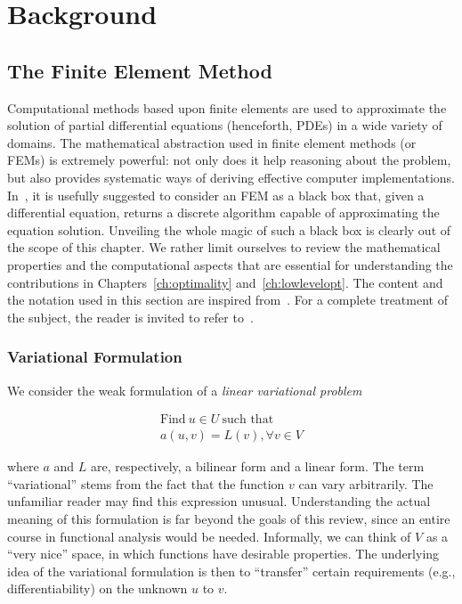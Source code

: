 \chapter{Background}

\section{The Finite Element Method}
\label{sec:bkg:fem}
Computational methods based upon finite elements are used to approximate the solution of partial differential equations (henceforth, PDEs) in a wide variety of domains. The mathematical abstraction used in finite element methods (or FEMs) is extremely powerful: not only does it help reasoning about the problem, but also provides systematic ways of deriving effective computer implementations. In~\cite{brenner-and-scott}, it is usefully suggested to consider an FEM as a black box that, given a differential equation, returns a discrete algorithm capable of approximating the equation solution. Unveiling the whole magic of such a black box is clearly out of the scope of this chapter. We rather limit ourselves to review the mathematical properties and the computational aspects that are essential for understanding the contributions in Chapters~\ref{ch:optimality} and~\ref{ch:lowlevelopt}. The content and the notation used in this section are inspired from~\cite{florian-thesis,kirby-and-logg,olgaard-and-wells}. For a complete treatment of the subject, the reader is invited to refer to~\cite{brenner-and-scott}.



\subsection{Variational Formulation}
\label{sec:bkg:coffee-var-problems}
We consider the weak formulation of a {\em linear variational problem}

\begin{equation}
\begin{split}
\text{Find}\ u \in U\ \text{such that} \\
a(u, v) = L(v), \forall v \in V
\end{split}
\end{equation}

where $a$ and $L$ are, respectively, a bilinear form and a linear form. The term ``variational'' stems from the fact that the function $v$ can vary arbitrarily. The unfamiliar reader may find this expression unusual. Understanding the actual meaning of this formulation is far beyond the goals of this review, since an entire course in functional analysis would be needed. Informally, we can think of $V$ as a ``very nice'' space, in which functions have desirable properties. The underlying idea of the variational formulation is then to ``transfer'' certain requirements (e.g., differentiability) on the unknown $u$ to $v$.

